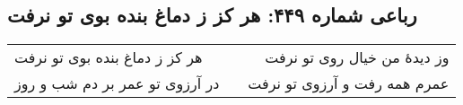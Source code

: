 \begin{center}
\section*{رباعی شماره ۴۴۹: هر کز ز دماغ بنده بوی تو نرفت}
\label{sec:0449}
\begin{longtable}{l p{0.5cm} r}
هر کز ز دماغ بنده بوی تو نرفت
&&
وز دیدهٔ من خیال روی تو نرفت
\\
در آرزوی تو عمر بر دم شب و روز
&&
عمرم همه رفت و آرزوی تو نرفت
\\
\end{longtable}
\end{center}
